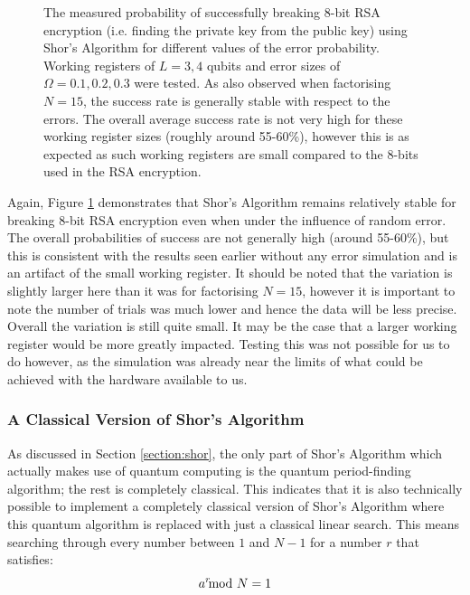 \documentclass{article}[11pt]
\begin{document}
\begin{figure}[H]
\begin{subfigure}[t]{0.7\textwidth}
\end{subfigure}
\caption{The measured probability of successfully breaking 8-bit RSA encryption (i.e. finding the private key from the public key) using Shor's Algorithm for different values of the error probability. Working registers of $L=3,4$ qubits and error sizes of $\Omega=0.1,0.2,0.3$ were tested. As also observed when factorising $N=15$, the success rate is generally stable with respect to the errors. The overall average success rate is not very high for these working register sizes (roughly around 55-60\%), however this is as expected as such working registers are small compared to the 8-bits used in the RSA encryption.}
\label{fig:breakRSAerrors}
\end{figure}

Again, Figure \ref{fig:breakRSAerrors} demonstrates that Shor's Algorithm remains relatively stable for breaking 8-bit RSA encryption even when under the influence of random error. The overall probabilities of success are not generally high (around 55-60\%), but this is consistent with the results seen earlier without any error simulation and is an artifact of the small working register. It should be noted that the variation is slightly larger here than it was for factorising $N=15$, however it is important to note the number of trials was much lower and hence the data will be less precise. Overall the variation is still quite small. It may be the case that a larger working register would be more greatly impacted. Testing this was not possible for us to do however, as the simulation was already near the limits of what could be achieved with the hardware available to us. 

\subsubsection{A Classical Version of Shor's Algorithm}
As discussed in Section \ref{section:shor}, the only part of Shor's Algorithm which actually makes use of quantum computing is the quantum period-finding algorithm; the rest is completely classical.\cite{candela} This indicates that it is also technically possible to implement a completely classical version of Shor's Algorithm where this quantum algorithm is replaced with just a classical linear search. This means searching through every number between $1$ and $N-1$ for a number $r$ that satisfies:
\begin{equation}
    a^r\hspace{-0.3cm}\mod N=1
\end{equation}
\end{document}

